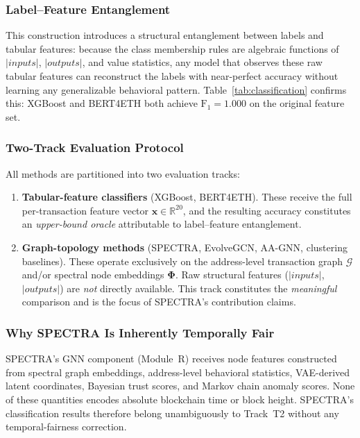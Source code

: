 \documentclass[journal]{IEEEtran}
\newcommand{\spectra}{\textsc{SPECTRA}}
\begin{document}
\subsubsection{Label--Feature Entanglement}
This construction introduces a structural entanglement between labels and
tabular features: because the class membership rules are algebraic functions of
$|\mathit{inputs}|$, $|\mathit{outputs}|$, and value statistics, any model that
observes these raw tabular features can reconstruct the labels with near-perfect
accuracy without learning any generalizable behavioral pattern.
Table~\ref{tab:classification} confirms this: XGBoost and BERT4ETH both achieve
$\text{F}_1 = 1.000$ on the original feature set.

\subsubsection{Two-Track Evaluation Protocol}
All methods are partitioned into two evaluation tracks:

\begin{enumerate}[leftmargin=*, label=\textbf{T\arabic*}]
  \item \textbf{Tabular-feature classifiers} (XGBoost, BERT4ETH). These receive
    the full per-transaction feature vector $\mathbf{x} \in \mathbb{R}^{20}$,
    and the resulting accuracy constitutes an \emph{upper-bound oracle}
    attributable to label--feature entanglement.

  \item \textbf{Graph-topology methods} (\spectra{}, EvolveGCN, AA-GNN, clustering
    baselines). These operate exclusively on the address-level transaction graph
    $\mathcal{G}$ and/or spectral node embeddings $\boldsymbol{\Phi}$.
    Raw structural features ($|\mathit{inputs}|$, $|\mathit{outputs}|$) are
    \emph{not} directly available.  This track constitutes the \emph{meaningful}
    comparison and is the focus of \spectra{}'s contribution claims.
\end{enumerate}

\subsubsection{Why \spectra{} Is Inherently Temporally Fair}
\spectra{}'s GNN component (Module~R) receives node features constructed from
spectral graph embeddings, address-level behavioral statistics, VAE-derived
latent coordinates, Bayesian trust scores, and Markov chain anomaly scores.
None of these quantities encodes absolute blockchain time or block height.
\spectra{}'s classification results therefore belong unambiguously to
Track~T2 without any temporal-fairness correction.
\end{document}
